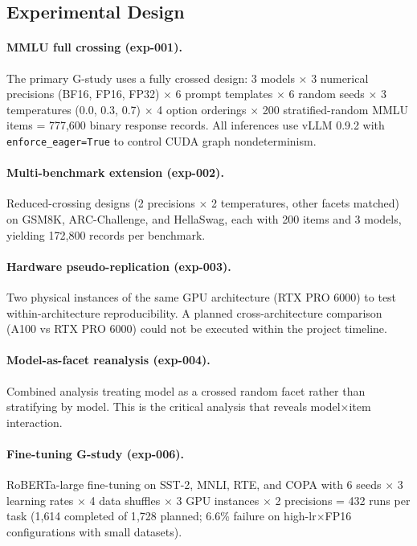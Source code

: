 \documentclass[11pt,twocolumn]{article}
\newcommand{\pct}{\%}
\begin{document}
\subsection{Experimental Design}

\paragraph{MMLU full crossing (exp-001).}
The primary G-study uses a fully crossed design: 3 models $\times$ 3 numerical precisions (BF16, FP16, FP32) $\times$ 6 prompt templates $\times$ 6 random seeds $\times$ 3 temperatures (0.0, 0.3, 0.7) $\times$ 4 option orderings $\times$ 200 stratified-random MMLU items = 777{,}600 binary response records. All inferences use vLLM 0.9.2 with \texttt{enforce\_eager=True} to control CUDA graph nondeterminism.

\paragraph{Multi-benchmark extension (exp-002).}
Reduced-crossing designs (2 precisions $\times$ 2 temperatures, other facets matched) on GSM8K, ARC-Challenge, and HellaSwag, each with 200 items and 3 models, yielding 172{,}800 records per benchmark.

\paragraph{Hardware pseudo-replication (exp-003).}
Two physical instances of the same GPU architecture (RTX PRO 6000) to test within-architecture reproducibility. A planned cross-architecture comparison (A100 vs RTX PRO 6000) could not be executed within the project timeline.

\paragraph{Model-as-facet reanalysis (exp-004).}
Combined analysis treating model as a crossed random facet rather than stratifying by model. This is the critical analysis that reveals model$\times$item interaction.

\paragraph{Fine-tuning G-study (exp-006).}
RoBERTa-large fine-tuning on SST-2, MNLI, RTE, and COPA with 6 seeds $\times$ 3 learning rates $\times$ 4 data shuffles $\times$ 3 GPU instances $\times$ 2 precisions = 432 runs per task (1{,}614 completed of 1{,}728 planned; 6.6\pct{} failure on high-lr$\times$FP16 configurations with small datasets).
\end{document}

